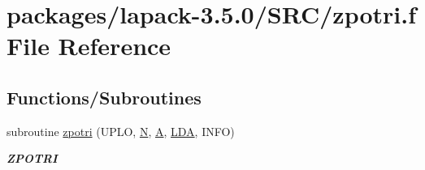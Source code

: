 \hypertarget{zpotri_8f}{}\section{packages/lapack-\/3.5.0/\+S\+R\+C/zpotri.f File Reference}
\label{zpotri_8f}
\subsection*{Functions/\+Subroutines}
\begin{DoxyCompactItemize}
\item 
subroutine \hyperlink{group__complex16POcomputational_gaf37e3b8bbacd3332e83ffb3f1018bcf1}{zpotri} (U\+P\+L\+O, \hyperlink{polmisc_8c_a0240ac851181b84ac374872dc5434ee4}{N}, \hyperlink{classA}{A}, \hyperlink{example__user_8c_ae946da542ce0db94dced19b2ecefd1aa}{L\+D\+A}, I\+N\+F\+O)
\begin{DoxyCompactList}\small\item\em {\bfseries Z\+P\+O\+T\+R\+I} \end{DoxyCompactList}\end{DoxyCompactItemize}

